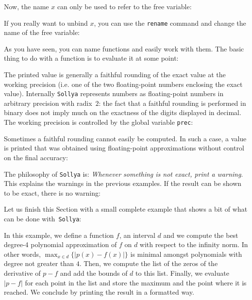\documentclass[a4paper]{article}
\newcommand{\com}[1]{\texttt{#1}}
\newcommand{\sollya}{\texttt{Sollya}\xspace}
\begin{document}


Now, the name $x$ can only be used to refer to the free variable:



If you really want to unbind $x$, you can use the \com{rename} command and change the name of the free variable:



As you have seen, you can name functions and easily work with them. The basic thing to do with a function is to evaluate it at some point:



The printed value is generally a faithful rounding of the exact value at the working precision (i.e. one of the two floating-point numbers enclosing the exact value). Internally \sollya represents numbers as floating-point numbers in arbitrary precision with radix~$2$: the fact that a faithful rounding is performed in binary does not imply much on the exactness of the digits displayed in decimal. The working precision is controlled by the global variable \com{prec}:



Sometimes a faithful rounding cannot easily be computed. In such a case, a value is printed that was obtained using floating-point approximations without control on the final accuracy:



The philosophy of \sollya is: \emph{Whenever something is not exact, print a warning}. This explains the warnings in the previous examples. If the result can be shown to be exact, there is no warning:



Let us finish this Section with a small complete example that shows a bit of what can be done with~\sollya:



In this example, we define a function $f$, an interval $d$ and we compute the best degree-4 polynomial approximation of $f$ on $d$ with respect to the infinity norm. In other words, $\max_{x \in d} \{|p(x)-f(x)|\}$ is minimal amongst polynomials with degree not greater than $4$. Then, we compute the list of the zeros of the derivative of $p-f$ and add the bounds of $d$ to this list. Finally, we evaluate $|p-f|$ for each point in the list and store the maximum and the point where it is reached. We conclude by printing the result in a formatted way.
\end{document}
